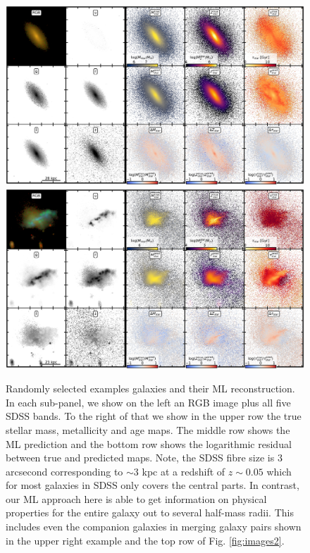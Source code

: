 \documentclass[useAMS,usenatbib]{mnras}
\begin{document}
\begin{figure}
\begin{center}
\includegraphics[width=.49\textwidth]{./plots/1579_masked.pdf}
\includegraphics[width=.49\textwidth]{./plots/1498_masked.pdf}
\end{center}
\vspace{-.35cm}
\caption{Randomly selected examples galaxies and their ML reconstruction. In each sub-panel, we show on the left an RGB image plus all five SDSS bands. To the right of that we show in the upper row the true stellar mass, metallicity and age maps. The middle row shows the ML prediction and the bottom row shows the logarithmic residual between true and predicted maps. Note, the SDSS fibre size is $3$ arcsecond corresponding to $\sim3$ kpc at a redshift of $z\sim0.05$ which for most galaxies in SDSS only covers the central parts. In contrast, our ML approach here is able to get information on physical properties for the entire galaxy out to several half-mass radii. This includes even the companion galaxies in merging galaxy pairs shown in the upper right example and the top row of Fig. \ref{fig:images2}.
}
\label{fig:images}
\end{figure}
\end{document}
